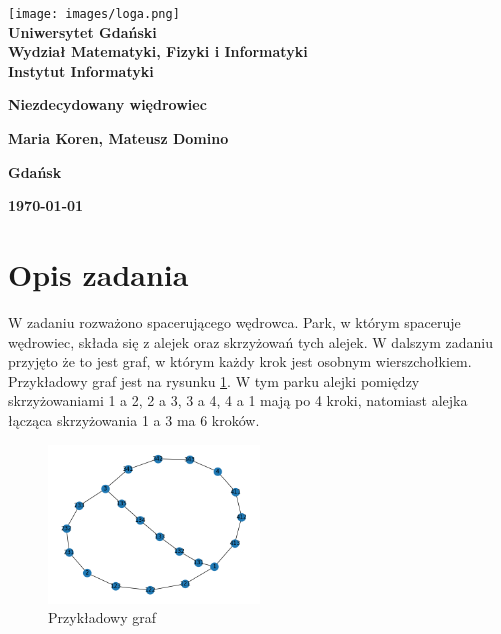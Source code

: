 \documentclass[12pt,a4paper]{article}
\newcommand{\hmwkTitle}{Niezdecydowany więdrowiec} %
\newcommand{\hmwkDueDate}{\today} %
\newcommand{\hmwkAuthorName}{Maria Koren, Mateusz Domino} %
\begin{document}
\begin{titlepage}
    \vfill
	\begin{center}
	\hspace*{-1cm}
	\vspace*{0.5cm}
    \texttt{[image: images/loga.png]}\\
	\textbf{Uniwersytet Gdański \\ [0.05cm]Wydział Matematyki, Fizyki i Informatyki \\ [0.05cm] Instytut Informatyki}

	\vspace{0.6cm}
	\vspace{4cm}
	{\huge \textbf{\hmwkTitle}}\vspace{8mm}
	
	{\large \textbf{\hmwkAuthorName}}\\[3cm]
	

	  \vfill
	
	\textbf{Gdańsk}
	
	\textbf{\hmwkDueDate}
	\end{center}
	
\end{titlepage}

\newpage
\setcounter{secnumdepth}{5}
\tableofcontents
\newpage

\section{Opis zadania}
W zadaniu rozważono spacerującego wędrowca. Park, w którym spaceruje wędrowiec, składa się z alejek oraz  skrzyżowań tych alejek. W dalszym zadaniu przyjęto że to jest graf, w którym każdy krok jest osobnym wierszchołkiem. Przykładowy graf jest na rysunku \ref{fig:przykladowygraf}. W tym parku alejki pomiędzy skrzyżowaniami 1 a 2, 2 a 3, 3 a 4, 4 a 1 mają po 4 kroki, natomiast alejka łącząca skrzyżowania 1 a 3 ma 6 kroków.

\begin{figure}[h]
  \centering
  \includegraphics[width=0.5\textwidth]{images/przykladowygraf.png}
  \caption{Przykładowy graf}
  \label{fig:przykladowygraf}
\end{figure}
\end{document}
